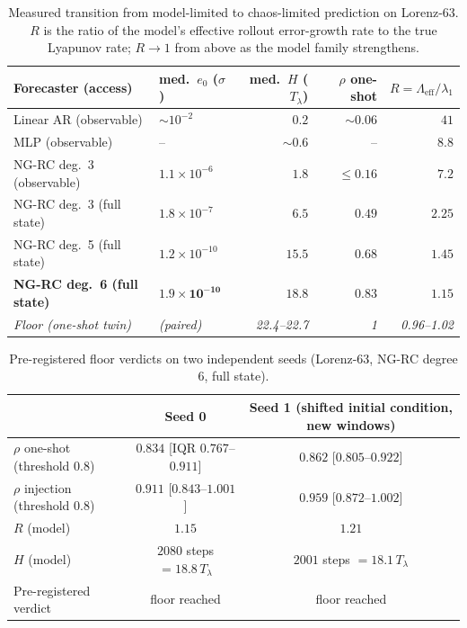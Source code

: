 \documentclass[aps,pre,twocolumn,superscriptaddress,nofootinbib,longbibliography]{revtex4-2}
\newcommand{\Tlyap}{T_\lambda}
\newcommand{\eff}{\mathrm{eff}}
\begin{document}
\begin{table}[t]
\centering
\begin{tabular}{l l r r r}
\toprule
Forecaster (access) & med.\ $e_0$ ($\sigma$) & med.\ $H$ ($\Tlyap$) &
$\rho$ one-shot & $R = \Lambda_\eff/\lambda_1$ \\
\midrule
Linear AR (observable)        & $\sim 10^{-2}$      & $0.2$  & $\sim 0.06$ & $41$ \\
MLP (observable)              & --                 & $\sim 0.6$ & --     & $8.8$ \\
NG-RC deg.\ 3 (observable)    & $1.1\times 10^{-6}$  & $1.8$  & $\le 0.16$  & $7.2$ \\
NG-RC deg.\ 3 (full state)    & $1.8\times 10^{-7}$  & $6.5$  & $0.49$      & $2.25$ \\
NG-RC deg.\ 5 (full state)    & $1.2\times 10^{-10}$ & $15.5$ & $0.68$      & $1.45$ \\
\textbf{NG-RC deg.\ 6 (full state)} & $\mathbf{1.9\times 10^{-10}}$ &
$\mathbf{18.8}$ & $\mathbf{0.83}$ & $\mathbf{1.15}$ \\
\emph{Floor (one-shot twin)}  & \emph{(paired)}     & \emph{22.4--22.7} &
\emph{1} & \emph{0.96--1.02} \\
\bottomrule
\end{tabular}
\caption{Measured transition from model-limited to chaos-limited
prediction on Lorenz-63. $R$ is the ratio of the model's effective
rollout error-growth rate to the true Lyapunov rate; $R \to 1$ from above
as the model family strengthens.}
\label{tab:transition}
\end{table}

\begin{table}[t]
\centering
\begin{tabular}{l c c}
\toprule
 & Seed 0 & Seed 1 (shifted initial condition, new windows) \\
\midrule
$\rho$ one-shot (threshold $0.8$) & $\mathbf{0.834}$ [IQR $0.767$--$0.911$]
  & $\mathbf{0.862}$ [$0.805$--$0.922$] \\
$\rho$ injection (threshold $0.8$) & $0.911$ [$0.843$--$1.001$]
  & $0.959$ [$0.872$--$1.002$] \\
$R$ (model)                    & $1.15$ & $1.21$ \\
$H$ (model)                    & $2080$ steps $= 18.8\,\Tlyap$
  & $2001$ steps $= 18.1\,\Tlyap$ \\
Pre-registered verdict         & floor reached & floor reached \\
\bottomrule
\end{tabular}
\caption{Pre-registered floor verdicts on two independent seeds
(Lorenz-63, NG-RC degree 6, full state).}
\label{tab:verdicts}
\end{table}
\end{document}
